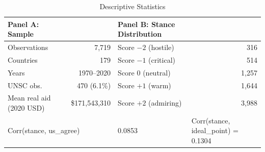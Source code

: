 \begin{table}[htbp]
\centering
\caption{Descriptive Statistics}
\label{tab:descriptives}
\begin{tabular}{lrlr}
\toprule
\textbf{Panel A: Sample} && \textbf{Panel B: Stance Distribution} & \\
\midrule
Observations & 7,719 & Score $-2$ (hostile) & 316 \\
Countries & 179 & Score $-1$ (critical) & 514 \\
Years & 1970--2020 & Score $0$ (neutral) & 1,257 \\
UNSC obs.\ & 470 (6.1\%) & Score $+1$ (warm) & 1,644 \\
Mean real aid (2020 USD) & \$171,543,310 & Score $+2$ (admiring) & 3,988 \\
\midrule
\multicolumn{2}{l}{Corr(stance, us\_agree)} & 0.0853 & \multicolumn{2}{l}{Corr(stance, ideal\_point) = 0.1304} \\
\bottomrule
\end{tabular}
\end{table}

